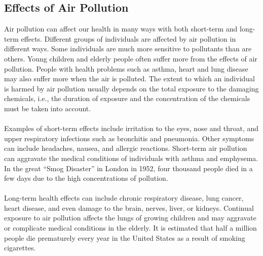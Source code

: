 \subsection{Effects of Air Pollution}
Air pollution can affect our health in many ways with both short-term and long-term effects. Different groups of individuals are affected by air pollution in different ways. Some individuals are much more sensitive to pollutants than are others. Young children and elderly people often suffer more from the effects of air pollution. People with health problems such as asthma, heart and lung disease may also suffer more when the air is polluted. The extent to which an individual is harmed by air pollution usually depends on the total exposure to the damaging chemicals, i.e., the duration of exposure and the concentration of the chemicals must be taken into account.
\\
\\
Examples of short-term effects include irritation to the eyes, nose and throat, and upper respiratory infections such as bronchitis and pneumonia. Other symptoms can include headaches, nausea, and allergic reactions. Short-term air pollution can aggravate the medical conditions of individuals with asthma and emphysema. In the great “Smog Disaster” in London in 1952, four thousand people died in a few days due to the high concentrations of pollution.
\\
\\
Long-term health effects can include chronic respiratory disease, lung cancer, heart disease, and even damage to the brain, nerves, liver, or kidneys. Continual exposure to air pollution affects the lungs of growing children and may aggravate or complicate medical conditions in the elderly. It is estimated that half a million people die prematurely every year in the United States as a result of smoking cigarettes.


